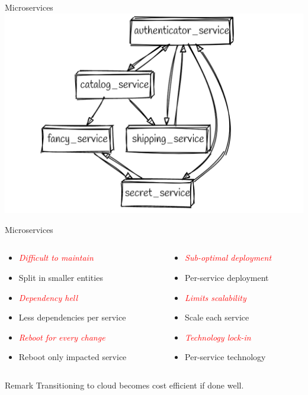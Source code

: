 \documentclass{beamer}
\begin{document}
\begin{frame}{Microservices}
    \includegraphics[width=\textwidth]{assets/mservices.png}
\end{frame}
\begin{frame}{Microservices}
    \begin{columns}
        \begin{column}{0.53\textwidth}
            \begin{itemize}
                \item \emph{\textcolor{red}{Difficult to maintain}}
                \item[ ] Split in smaller entities 
                \item \emph{\textcolor{red}{Dependency hell}}
                \item[ ] Less dependencies per service
                \item \emph{\textcolor{red}{Reboot for every change}}
                \item[ ] Reboot only impacted service
            \end{itemize}
        \end{column}
        \begin{column}{0.5\textwidth}
            \begin{itemize}
                \item \emph{\textcolor{red}{Sub-optimal deployment}}
                \item[ ] Per-service deployment
                \item \emph{\textcolor{red}{Limits scalability}}
                \item[ ] Scale each service
                \item \emph{\textcolor{red}{Technology lock-in}}
                \item[ ] Per-service technology
            \end{itemize}
        \end{column}
    \end{columns}
    \vspace{1cm}
    \begin{alertblock}{Remark}
        Transitioning to cloud becomes cost efficient if done well.
    \end{alertblock}
\end{frame}
\end{document}
